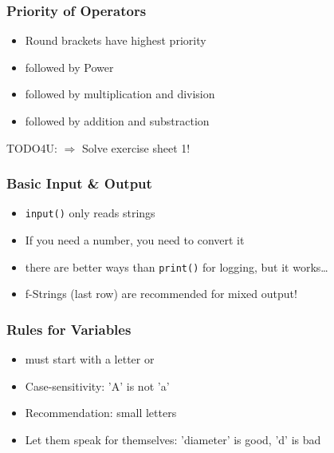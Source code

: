 \documentclass[ngerman]{beamer}
\begin{document}
\begin{frame}
\frametitle{Priority of Operators}

\begin{itemize}
\item Round brackets have highest priority
\item followed by Power
\item followed by multiplication and division
\item followed by addition and substraction
\end{itemize}

\begin{block}{TODO4U:}
$\Rightarrow$ Solve exercise sheet 1!
\end{block}

\end{frame}

\begin{frame}[fragile]
\frametitle{Basic Input \& Output}



\begin{itemize}
	\item \lstinline[style=Python]{input()} only reads strings	
	\item If you need a number, you need to convert it
	\item there are better ways than \lstinline[style=Python]{print()} for logging, but it works\ldots 
	\item f-Strings (last row) are recommended for mixed output!
	\end{itemize}
\end{frame}

\begin{frame}
\frametitle{Rules for Variables}

\begin{itemize}
\item must start with a letter or \textunderscore
\item Case-sensitivity: 'A' is not 'a'
\item Recommendation: small letters
\item Let them speak for themselves: 'diameter' is good, 'd' is bad 
\end{itemize}
\end{frame}
\end{document}
